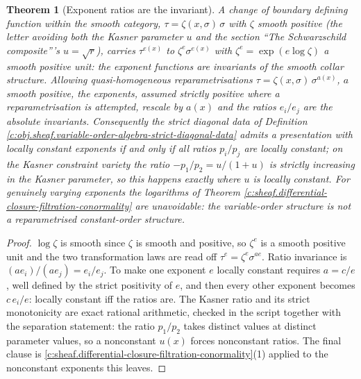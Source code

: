 \documentclass[11pt]{article}
\newtheorem{theorem}{Theorem}[section]
\theoremstyle{definition}
\theoremstyle{plain}
\newcommand{\changedmark}[2]{\marginpar{\raggedright\scriptsize\color{#1}#2}}
\begin{document}
\begin{theorem}[Exponent ratios are the invariant]\label{c:sheaf.exponent-ratios-are-invariant}
\changedmark{gray}{reworded}
A change of boundary defining function within the smooth category, $\tau = \zeta(x,\sigma)\,\sigma$ with $\zeta$ smooth positive (the letter avoiding both the Kasner parameter $u$ and the section ``The Schwarzschild composite'''s $u = \sqrt r$), carries $\tau^{e(x)}$ to $\zeta^{e}\sigma^{e(x)}$ with $\zeta^{e} = \exp(e\log \zeta)$ a smooth positive unit: the exponent functions are invariants of the smooth collar structure. Allowing quasi-homogeneous reparametrisations $\tau = \zeta(x,\sigma)\,\sigma^{a(x)}$, $a$ smooth positive, the exponents, assumed strictly positive where a reparametrisation is attempted, rescale by $a(x)$ and the \emph{ratios} $e_i/e_j$ are the absolute invariants. Consequently the strict diagonal data of Definition \ref{c:obj.sheaf.variable-order-algebra-strict-diagonal-data} admits a presentation with locally constant exponents if and only if all ratios $p_i/p_j$ are locally constant; on the Kasner constraint variety the ratio $-p_1/p_2 = u/(1+u)$ is strictly increasing in the Kasner parameter, so this happens exactly where $u$ is locally constant. For genuinely varying exponents the logarithms of Theorem \ref{c:sheaf.differential-closure-filtration-conormality} are unavoidable: the variable-order structure is not a reparametrised constant-order structure.
\end{theorem}
\begin{proof}
$\log \zeta$ is smooth since $\zeta$ is smooth and positive, so $\zeta^{e}$ is a smooth positive unit and the two transformation laws are read off $\tau^{e} = \zeta^{e}\sigma^{ae}$. Ratio invariance is $(a e_i)/(a e_j) = e_i/e_j$. To make one exponent $e$ locally constant requires $a = c/e$, well defined by the strict positivity of $e$, and then every other exponent becomes $c\,e_i/e$: locally constant iff the ratios are. The Kasner ratio and its strict monotonicity are exact rational arithmetic, checked in the script together with the separation statement: the ratio $p_1/p_2$ takes distinct values at distinct parameter values, so a nonconstant $u(x)$ forces nonconstant ratios. The final clause is \ref{c:sheaf.differential-closure-filtration-conormality}(1) applied to the nonconstant exponents this leaves.

\end{proof}
\end{document}

